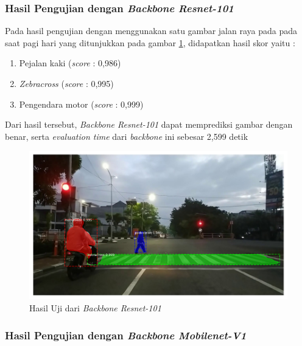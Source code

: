 \subsubsection{Hasil Pengujian dengan \textit{Backbone Resnet-101}}

Pada hasil pengujian dengan menggunakan satu gambar jalan raya pada pada saat pagi hari yang ditunjukkan pada gambar \ref{fig:hasil-resnet101}, didapatkan hasil skor yaitu :
\begin{enumerate}[nolistsep]
	\item Pejalan kaki (\textit{score} : 0,986)
	\item \textit{Zebracross} (\textit{score} : 0,995)
	\item Pengendara motor (\textit{score} : 0,999)
\end{enumerate}
Dari hasil tersebut, \textit{Backbone Resnet-101} dapat memprediksi gambar dengan benar, serta \textit{evaluation time} dari \textit{backbone} ini sebesar 2,599 detik
\begin{figure}[h] 
	\centering
	\includegraphics[scale=0.3]{gambar/fajar-frame800-resnet101.png}
	\caption{Hasil Uji dari \textit{Backbone Resnet-101}}
	\label{fig:hasil-resnet101}
\end{figure}

\subsubsection{Hasil Pengujian dengan \textit{Backbone Mobilenet-V1}}


